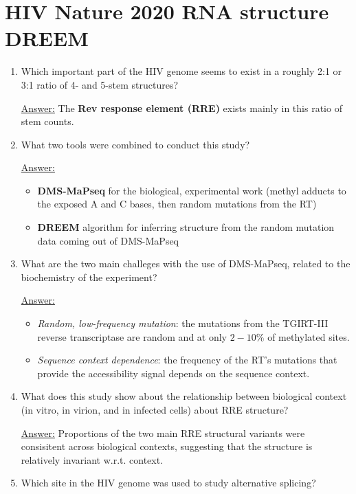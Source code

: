 \documentclass{article}
\newenvironment{QandA}{\begin{enumerate}[label=\bfseries Q\arabic*.]}
                       {\end{enumerate}}
\newenvironment{answered}{\par\normalfont\underline{Answer:}}{}
\begin{document}
\section{HIV Nature 2020 RNA structure DREEM}
\begin{QandA}
  \item{Which important part of the HIV genome seems to exist in a roughly 2:1 or 3:1 ratio of 4- and 5-stem structures?}
    \begin{answered}
    The \textbf{Rev response element (RRE)} exists mainly in this ratio of stem counts.
    \end{answered}
  \item{What two tools were combined to conduct this study?}
    \begin{answered}
    \begin{itemize}
      \item{\textbf{DMS-MaPseq} for the biological, experimental work (methyl adducts to the exposed A and C bases, then random mutations from the RT)}
      \item{\textbf{DREEM} algorithm for inferring structure from the random mutation data coming out of DMS-MaPseq}
    \end{itemize}
    \end{answered}
  \item{What are the two main challeges with the use of DMS-MaPseq, related to the biochemistry of the experiment?}
    \begin{answered}
    \begin{itemize}
      \item{\textit{Random, low-frequency mutation}: the mutations from the TGIRT-III reverse transcriptase are random and at only $2-10\%$ of methylated sites.}
      \item{\textit{Sequence context dependence}: the frequency of the RT's mutations that provide the accessibility signal depends on the sequence context.}
    \end{itemize}
    \end{answered}
  \item{What does this study show about the relationship between biological context (in vitro, in virion, and in infected cells) about RRE structure?}
    \begin{answered}
    Proportions of the two main RRE structural variants were consisitent across biological contexts, suggesting that the structure is relatively invariant w.r.t. context.
    \end{answered}
  \item{Which site in the HIV genome was used to study alternative splicing?}

\end{QandA}
\end{document}

